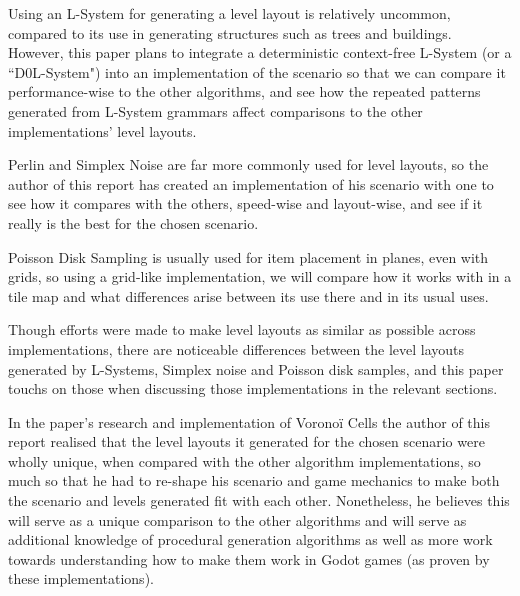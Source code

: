 Using an L-System for generating a level layout is relatively uncommon, compared to its use in generating structures such as trees and buildings. However, this paper plans to integrate a deterministic context-free L-System (or a ``D0L-System") into an implementation of the scenario so that we can compare it performance-wise to the other algorithms, and see how the repeated patterns generated from L-System grammars affect comparisons to the other implementations' level layouts. 

Perlin and Simplex Noise are far more commonly used for level layouts, so the author of this report has created an implementation of his scenario with one to see how it compares with the others, speed-wise and layout-wise, and see if it really is the best for the chosen scenario.

Poisson Disk Sampling is usually used for item placement in planes, even with grids, so using a grid-like implementation, we will compare how it works with in a tile map and what differences arise between its use there and in its usual uses.

Though efforts were made to make level layouts as similar as possible across implementations, there are noticeable differences between the level layouts generated by L-Systems, Simplex noise and Poisson disk samples, and this paper touchs on those when discussing those implementations in the relevant sections.

In the paper's research and implementation of Voronoï Cells the author of this report realised that the level layouts it generated for the chosen scenario were wholly unique, when compared with the other algorithm implementations, so much so that he had to re-shape his scenario and game mechanics to make both the scenario and levels generated fit with each other. Nonetheless, he believes this will serve as a unique comparison to the other algorithms and will serve as additional knowledge of procedural generation algorithms as well as more work towards understanding how to make them work in Godot games (as proven by these implementations).
